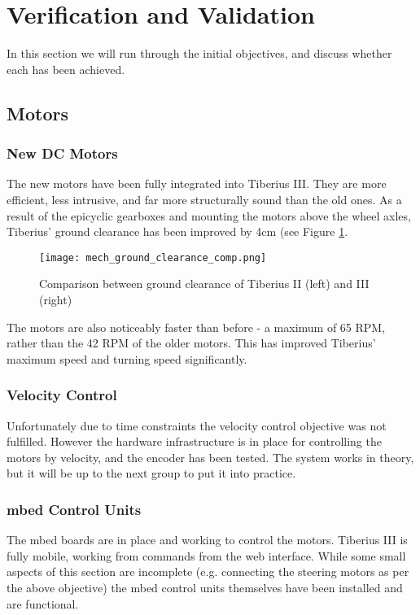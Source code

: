 \section{Verification and Validation}
In this section we will run through the initial objectives, and discuss whether each has been achieved.
\subsection{Motors}
\subsubsection{New DC Motors}
The new motors have been fully integrated into Tiberius III. They are more efficient, less intrusive, and far more structurally sound than the old ones. As a result of the epicyclic gearboxes and mounting the motors above the wheel axles, Tiberius' ground clearance has been improved by 4cm (see Figure \ref{fig:mech_gc}.
\begin{figure}[!htb]
\begin{center}
\texttt{[image: mech\_ground\_clearance\_comp.png]}
\end{center}
\caption{Comparison between ground clearance of Tiberius II (left) and III (right)}
\label{fig:mech_gc}
\end{figure}
\newline
The motors are also noticeably faster than before - a maximum of 65 RPM, rather than the 42 RPM of the older motors. This has improved Tiberius' maximum speed and turning speed significantly.

\subsubsection{Velocity Control}
Unfortunately due to time constraints the velocity control objective was not fulfilled. However the hardware infrastructure is in place for controlling the motors by velocity, and the encoder has been tested. The system works in theory, but it will be up to the next group to put it into practice.

\subsubsection{mbed Control Units}
The mbed boards are in place and working to control the motors. Tiberius III is fully mobile, working from commands from the web interface. While some small aspects of this section are incomplete (e.g. connecting the steering motors as per the above objective) the mbed control units themselves have been installed and are functional.

